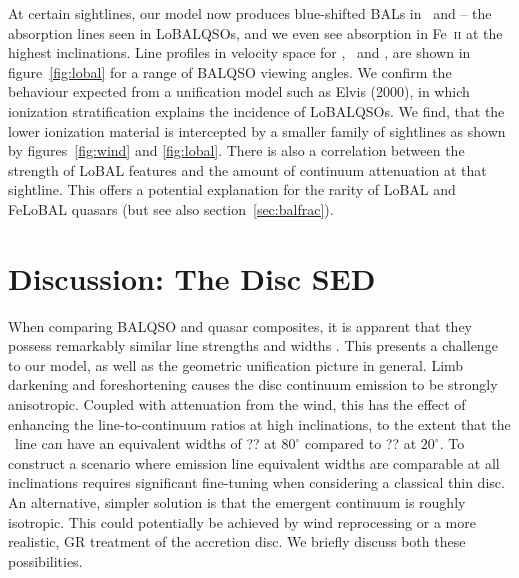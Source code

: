 \documentclass[useAMS,usenatbib]{mn2e_x}
\begin{document}
At certain sightlines, our model now produces blue-shifted BALs in \al\ and \mg --
the absorption lines seen in LoBALQSOs, and we even see absorption in Fe~\textsc{ii}
at the highest inclinations. Line profiles in velocity space 
for \civ, \al\ and \mg, are shown in figure~\ref{fig:lobal} for a range
of BALQSO viewing angles. We confirm the behaviour expected from 
a unification model such as Elvis (2000), in which ionization stratification
explains the incidence of LoBALQSOs. We find, that the lower
ionization material is intercepted by a smaller family of sightlines as shown by 
figures~\ref{fig:wind} and \ref{fig:lobal}.
There is also a correlation between the strength of LoBAL features
and the amount of continuum attenuation at that sightline. 
This offers a potential explanation for the rarity of LoBAL and
FeLoBAL quasars (but see also section~\ref{sec:balfrac}).









\section{Discussion: The Disc SED}

When comparing BALQSO and quasar composites, it is apparent
that they possess remarkably similar line strengths and widths 
\citep[e.g.][]{reichard2003}.
This presents a challenge to our model, as well as the geometric 
unification picture in general.
Limb darkening and foreshortening causes the disc continuum emission to be 
strongly anisotropic. Coupled with attenuation from the wind, 
this has the effect of enhancing the 
line-to-continuum ratios at high inclinations, to the extent
that the \civ\ line can have an equivalent widths of ?? at $80^\circ$
compared to ?? at $20^\circ$. To construct a scenario where emission 
line equivalent widths are comparable at all inclinations requires 
significant fine-tuning when considering a classical thin disc. 
An alternative, simpler solution is that the emergent continuum is roughly isotropic.
This could potentially be achieved by wind reprocessing or a more realistic, GR treatment
of the accretion disc. We briefly discuss both these possibilities.
\end{document}

